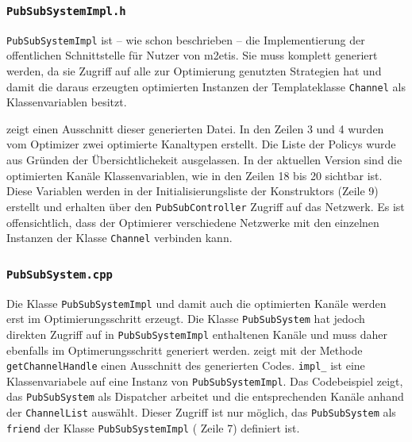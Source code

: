 


\subsubsection*{\texttt{PubSubSystemImpl.h}}
\texttt{PubSubSystemImpl} ist -- wie schon beschrieben -- die Implementierung der offentlichen Schnittstelle für Nutzer von \ac{m2etis}. Sie muss komplett generiert werden, da sie Zugriff auf alle zur Optimierung genutzten Strategien hat und damit die daraus erzeugten optimierten Instanzen der Templateklasse \texttt{Channel} als Klassenvariablen besitzt.

 zeigt einen Ausschnitt dieser generierten Datei. In den Zeilen 3 und 4 wurden vom Optimizer zwei optimierte Kanaltypen erstellt. Die Liste der Policys wurde aus Gründen der Übersichtlichekeit ausgelassen. In der aktuellen Version sind die optimierten Kanäle Klassenvariablen, wie in den Zeilen 18 bis 20 sichtbar ist.  Diese Variablen werden in der Initialisierungsliste der Konstruktors (Zeile 9) erstellt und erhalten über den \texttt{PubSubController} Zugriff auf das Netzwerk. Es ist offensichtlich, dass der Optimierer verschiedene Netzwerke mit den einzelnen Instanzen der Klasse \texttt{Channel} verbinden kann.




\subsubsection*{\texttt{PubSubSystem.cpp}}
Die Klasse \texttt{PubSubSystemImpl} und damit auch die optimierten Kanäle werden erst im Optimierungsschritt erzeugt. Die Klasse \texttt{PubSubSystem} hat jedoch direkten Zugriff auf in \texttt{PubSubSystemImpl} enthaltenen Kanäle und muss daher ebenfalls im Optimerungsschritt generiert werden.  zeigt mit der Methode \texttt{getChannelHandle} einen Ausschnitt des generierten Codes. \texttt{impl\_} ist eine Klassenvariabele auf eine Instanz von \texttt{PubSubSystemImpl}. Das Codebeispiel zeigt, das \texttt{PubSubSystem} als Dispatcher arbeitet und die entsprechenden Kanäle anhand der \texttt{ChannelList} auswählt. Dieser Zugriff ist nur möglich, das \texttt{PubSubSystem} als \texttt{friend} der Klasse \texttt{PubSubSystemImpl} ( Zeile 7) definiert ist.

